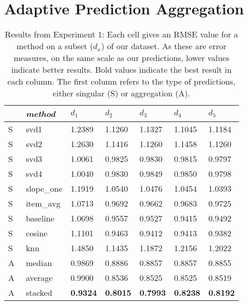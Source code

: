 \section{Adaptive Prediction Aggregation}

\begin{table}[t]
  \begin{tabular*}{\textwidth}{ l p{3cm} p{1.5cm} p{1.5cm} p{1.5cm} p{1.5cm} p{1.5cm} }
    \toprule
      ~ & \emph{method} & 
      $d_1$ & $d_2$ & $d_3$ & $d_4$ & $d_5$ \\ 
    \midrule
    S & svd1          & 1.2389	  & 1.1260	  & 1.1327	  & 1.1045	  & 1.1184	 \\
    S & svd2          & 1.2630	  & 1.1416    & 1.1260	  & 1.1458	  & 1.1260	 \\
    S & svd3          & 1.0061	  & 0.9825	  & 0.9830	  & 0.9815	  & 0.9797	 \\
    S & svd4          & 1.0040	  & 0.9830	  & 0.9849	  & 0.9850	  & 0.9798	 \\
    S & slope\_one    & 1.1919	  & 1.0540	  & 1.0476	  & 1.0454	  & 1.0393   \\
    S & item\_avg     & 1.0713	  & 0.9692	  & 0.9662	  & 0.9683	  & 0.9725	 \\
    S & baseline       & 1.0698	  & 0.9557	  & 0.9527	  & 0.9415	  & 0.9492	 \\
    S & cosine   	    & 1.1101	  & 0.9463	  & 0.9412	  & 0.9413	  & 0.9382	 \\
    S & knn       	  & 1.4850	  & 1.1435	  & 1.1872    & 1.2156	  & 1.2022	 \\
    \midrule                                                                    
    A & median    	  & 0.9869	  & 0.8886	  & 0.8857    & 0.8857	  & 0.8855	 \\
    A & average    	  & 0.9900	  & 0.8536	  & 0.8525	  & 0.8525	  & 0.8519	 \\
    A & stacked       & \textbf{0.9324}	  & \textbf{0.8015}	  & \textbf{0.7993}  & \textbf{0.8238} & \textbf{0.8192} \\
    \bottomrule
  \end{tabular*}
  \caption[Results from Experiment 1]{
    Results from Experiment 1:
    Each cell gives an RMSE value for a method on a subset ($d_x$) of our dataset.
    As these are error measures, on the same scale as our predictions,
    lower values indicate better results. Bold values indicate the best result in each column.
    The first column refers to the type of predictions, either singular (S) or aggregation (A).}
  \label{table:results:e1}
\end{table}

